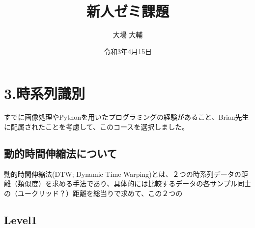 



\graphicspath{{./pic/}}
\setlength{\textwidth}{16.2cm}%
\setlength{\textheight}{23cm}%
\setlength{\topmargin}{-1.5cm}
\setlength{\oddsidemargin}{0cm}
\setlength{\evensidemargin}{0cm}
\setlength{\parskip}{1pt}
\pagestyle{fancy}
\title{新人ゼミ課題}
\author{大場 大輔}
\date{令和3年4月15日}


	
	\maketitle
	\vspace*{20pt}

	
\section*{3.時系列識別}
すでに画像処理やPythonを用いたプログラミングの経験があること、Brian先生に配属されたことを考慮して、このコースを選択しました。

\subsection*{動的時間伸縮法について}
動的時間伸縮法(DTW; Dynamic Time Warping)とは、２つの時系列データの距離（類似度）を求める手法であり、具体的には比較するデータの各サンプル同士の（ユークリッド？）距離を総当りで求めて、この２つの




\subsection*{Level1}


